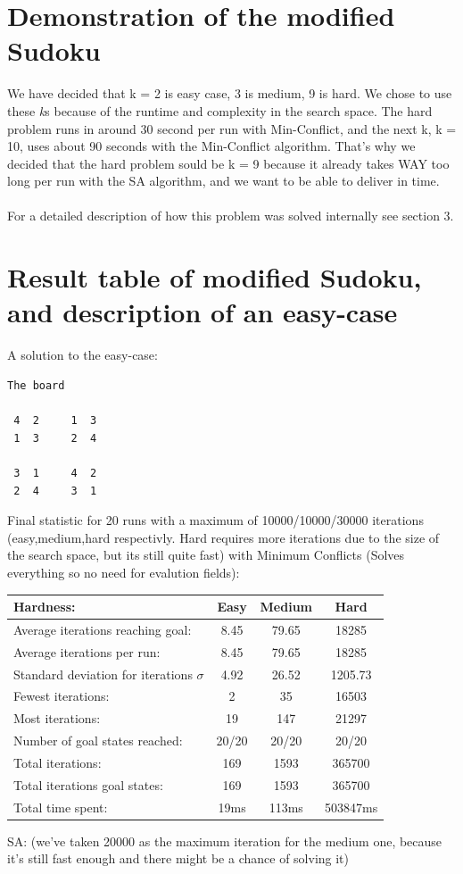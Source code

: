 \documentclass[12pt, a4paper]{article}
\begin{document}
\section{Demonstration of the modified Sudoku}
We have decided that k = 2 is easy case, 3 is medium, 9 is hard. 
We chose to use these \textit{k}s because of the runtime and complexity in the search space. The hard problem runs in around 30 second per run with Min-Conflict, and the next k, k = 10, uses about 90 seconds with the Min-Conflict algorithm. That's why we decided that the hard problem sould be k = 9 because it already takes WAY too long per run with the SA algorithm, and we want to be able to deliver in time.
\\\\
For a detailed description of how this problem was solved internally see section 3.

\section{Result table of modified Sudoku, and description of an easy-case}
A solution to the easy-case:
\begin{verbatim}
The board

 4  2     1  3 
 1  3     2  4 

 3  1     4  2 
 2  4     3  1 

\end{verbatim}

\noindent
Final statistic for 20 runs with a maximum of 10000/10000/30000 iterations (easy,medium,hard respectivly. Hard requires more iterations due to the size of the search space, but its still quite fast) with Minimum Conflicts (Solves everything so no need for evalution fields):

\begin{center}
  \begin{tabular}{| l | c c c|}
    \hline
    Hardness: &\textbf{Easy} & \textbf{Medium} & \textbf{Hard} \\ \hline
    Average iterations reaching goal: & 8.45& 79.65 & 18285\\
    Average iterations per run:  & 8.45 & 79.65 & 18285\\
    Standard deviation for iterations $\sigma$ & 4.92 & 26.52 & 1205.73\\
    Fewest iterations: & 2 & 35& 16503\\ 
    Most iterations: & 19 & 147& 21297\\ 
    Number of goal states reached: & 20/20 & 20/20 & 20/20\\
    Total iterations: & 169 & 1593& 365700\\
    Total iterations goal states: & 169 & 1593& 365700\\
    Total time spent: & 19ms & 113ms & 503847ms\\
    \hline
  \end{tabular}
\end{center}
\noindent
SA: (we've taken 20000 as the maximum iteration for the medium one, because it's still fast enough and there might be a chance of solving it)\\
\end{document}
